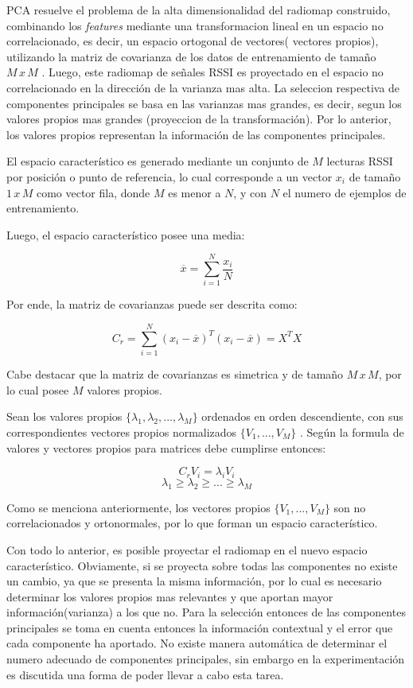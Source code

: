PCA resuelve el problema de la alta dimensionalidad del radiomap construido, combinando los \textit{features} mediante una transformacion lineal en un espacio no correlacionado, es decir, un espacio ortogonal de vectores( vectores propios), utilizando la matriz de covarianza de los datos de entrenamiento de tamaño $ M \, x \, M$ . Luego, este radiomap de señales RSSI es proyectado en el espacio no correlacionado en la dirección de la varianza mas alta. La seleccion respectiva de componentes principales se basa en las varianzas mas grandes, es decir, segun los valores propios mas grandes (proyeccion de la transformación). Por lo anterior, los valores propios representan la información de las componentes principales.

El espacio característico es generado mediante un conjunto de $M$ lecturas RSSI por posición o punto de referencia, lo cual corresponde a un vector $x_{i}$ de tamaño $ 1 \, x \, M$ como vector fila, donde $ M$ es menor a $ N$, y con $ N$ el numero de ejemplos de entrenamiento.

Luego, el espacio característico posee una media:

$$ \overline{x} = \sum_{i=1}^{N} \frac{x_{i}}{N} $$

Por ende, la matriz de covarianzas puede ser descrita como:

$$ C_{r} = \sum_{i=1}^{N} (x_{i} - \overline{x})^{T}(x_{i} - \overline{x}) = X^{T}X$$

Cabe destacar que la matriz de covarianzas es simetrica y de tamaño $M \, x \, M$, por lo cual posee $M$ valores propios.

Sean los valores propios $ \{ \lambda_{1}, \lambda_{2}, ..., \lambda_{M} \} $ ordenados en orden descendiente, con sus correspondientes vectores propios normalizados $ \{ V_{1}, ... , V_{M} \} $ . Según la formula de valores y vectores propios para matrices debe cumplirse entonces:

$$ C_{r} V_{i} =  \lambda_{i} V_{i}$$
$$ \lambda_{1} \geq \lambda_{2} \geq ... \geq \lambda_{M}$$

Como se menciona anteriormente, los vectores propios $ \{ V_{1}, ... , V_{M} \} $ son no correlacionados y ortonormales, por lo que forman un espacio característico.

Con todo lo anterior, es posible proyectar el radiomap en el nuevo espacio característico. Obviamente, si se proyecta sobre todas las componentes no existe un cambio, ya que se presenta la misma información, por lo cual es necesario determinar los valores propios mas relevantes y que aportan mayor información(varianza) a los que no. Para la selección entonces de las componentes principales se toma en cuenta entonces la información contextual y el error que cada componente ha aportado. No existe manera automática de determinar el numero adecuado de componentes principales, sin embargo en la experimentación es discutida una forma de poder llevar a cabo esta tarea. 

